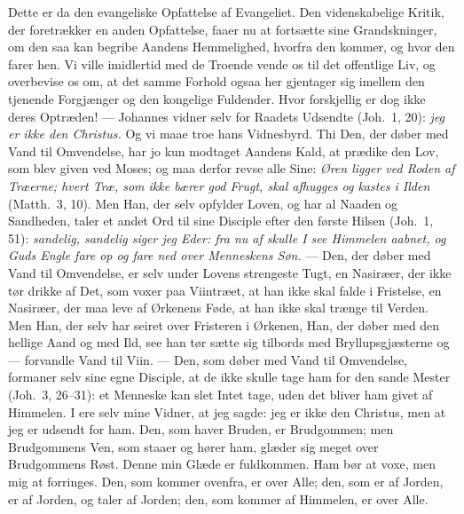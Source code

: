 \documentclass[12pt,a4paper]{book}
\begin{document}
Dette er da den evangeliske Opfattelse af Evangeliet. Den videnskabelige Kritik,
der foretrækker en anden Opfattelse, faaer nu at fortsætte sine Grandskninger, om
den saa kan begribe Aandens Hemmelighed, hvorfra den kommer, og hvor den farer
hen. Vi ville imidlertid med de Troende vende os til det offentlige Liv, og
overbevise os om, at det samme Forhold ogsaa her gjentager sig imellem den
tjenende Forgjænger og den kongelige Fuldender. Hvor forskjellig er dog ikke
deres Optræden! --- Johannes vidner selv for Raadets Udsendte (Joh.\ 1, 20):
\emph{jeg er ikke den Christus.} Og vi maae troe hans Vidnesbyrd. Thi Den, der
døber med Vand til Omvendelse, har jo kun modtaget Aandens Kald, at prædike den
Lov, som blev given ved Moses; og maa derfor revse alle Sine: \emph{Øren ligger
ved Roden af Træerne; hvert Træ, som ikke bærer god Frugt, skal afhugges og
kastes i Ilden} (Matth.\ 3, 10).
Men Han, der selv opfylder Loven, og har al Naaden og Sandheden, taler et andet
Ord til sine Disciple efter den første Hilsen (Joh.\ 1, 51): \emph{sandelig,
sandelig siger jeg Eder: fra nu af skulle I see Himmelen aabnet, og Guds Engle
fare op og fare ned over Menneskens Søn.} --- Den, der døber med Vand til
Omvendelse, er selv under Lovens strengeste Tugt, en Nasiræer, der ikke tør
drikke af Det, som voxer paa Viintræet, at han
ikke skal falde i Fristelse, en Nasiræer, der maa leve af Ørkenens Føde, at han
ikke skal trænge til Verden. Men Han, der selv har seiret over Fristeren i
Ørkenen, Han, der døber med den hellige Aand og med Ild, see han tør sætte sig
tilbords med Bryllupsgjæsterne og --- forvandle Vand til Viin. --- Den, som døber
med Vand til Omvendelse, formaner selv sine egne Disciple, at de ikke skulle tage
ham for den sande Mester (Joh.\ 3, 26--31): {\large et Menneske kan slet Intet
tage, uden det bliver ham givet af Himmelen. I ere selv mine Vidner, at jeg
sagde: jeg er ikke den Christus, men at jeg er udsendt for ham. Den, som haver
Bruden, er Brudgommen; men Brudgommens Ven, som staaer og hører ham, glæder sig
meget over Brudgommens Røst. Denne min Glæde er fuldkommen. Ham bør at voxe, men
mig at forringes. Den, som kommer ovenfra, er over Alle; den, som er af Jorden,
er af Jorden, og taler af Jorden; den, som kommer af Himmelen, er over Alle.}
\end{document}
